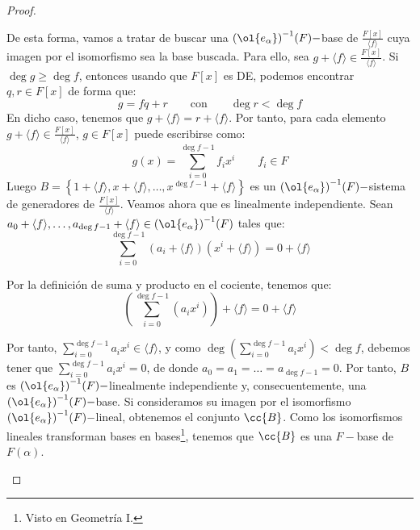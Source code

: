 \begin{prop}
\begin{proof}
\begin{itemize}
                De esta forma, vamos a tratar de buscar una ${(\ol{e_\alpha})}^{-1}(F)-$base de $\frac{F[x]}{\langle f \rangle }$ cuya imagen por el isomorfismo sea la base buscada. Para ello, sea $g+\langle f \rangle \in \frac{F[x]}{\langle f \rangle }$. Si $\deg g \geq \deg f$, entonces usando que $F[x]$ es DE, podemos encontrar $q,r\in F[x]$ de forma que:
                \begin{equation*}
                    g = fq + r \qquad \text{con} \qquad \deg r < \deg f
                \end{equation*}
                En dicho caso, tenemos que $g+\langle f \rangle = r+ \langle f \rangle $. Por tanto, para cada elemento $g+\langle f \rangle \in \frac{F[x]}{\langle f \rangle }$, $g\in F[x]$ puede escribirse como:
                \begin{equation*}
                    g(x) = \sum\limits_{i=0}^{\deg f-1} f_ix^i \qquad f_i \in F 
                \end{equation*}
                Luego $B=\left\{1+\langle f \rangle,x+\langle f \rangle, \ldots, x^{\deg f-1}+\langle f \rangle  \right\}$ es un ${(\ol{e_\alpha})}^{-1}(F)-$sistema de generadores de $\frac{F[x]}{\langle f \rangle }$. Veamos ahora que es linealmente independiente. Sean $a_0+\langle f \rangle ,\ldots, a_{\deg f-1}+\langle f \rangle \in {(\ol{e_\alpha})}^{-1}(F)$ tales que:
                \begin{equation*}
                    \sum\limits_{i=0}^{\deg f-1} (a_i+\langle f \rangle)(x^i+\langle f \rangle) = 0 + \langle f \rangle
                \end{equation*}

                Por la definición de suma y producto en el cociente, tenemos que:
                \begin{equation*}
                    \left(\sum\limits_{i=0}^{\deg f-1} (a_i x^i)\right) + \langle f \rangle = 0 + \langle f \rangle
                \end{equation*}

                Por tanto, $\sum\limits_{i=0}^{\deg f-1} a_i x^i \in \langle f \rangle $, y como $\deg \left(\sum\limits_{i=0}^{\deg f-1} a_i x^i\right) < \deg f$, debemos tener que $\sum\limits_{i=0}^{\deg f-1} a_i x^i = 0$, de donde $a_0 = a_1 = \ldots = a_{\deg f-1} = 0$. Por tanto, $B$ es ${(\ol{e_\alpha})}^{-1}(F)-$linealmente independiente y, consecuentemente, una ${(\ol{e_\alpha})}^{-1}(F)-$base. Si consideramos su imagen por el isomorfismo ${(\ol{e_\alpha})}^{-1}(F)-$lineal, obtenemos el conjunto $\cc{B}$. Como los isomorfismos lineales transforman bases en bases\footnote{Visto en Geometría I.}, tenemos que $\cc{B}$ es una $F-$base de $F(\alpha)$.
        \end{itemize}
    \end{proof}
\end{prop}

